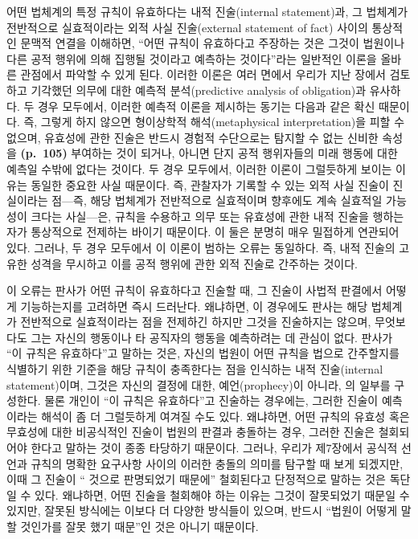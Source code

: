 어떤 법체계의 특정 규칙이 유효하다는 내적 진술(internal statement)과, 그
법체계가 전반적으로 실효적이라는 외적 사실 진술(external statement of
fact) 사이의 통상적인 문맥적 연결을 이해하면, ``어떤 규칙이 유효하다고
주장하는 것은 그것이 법원이나 다른 공적 행위에 의해 집행될 것이라고
예측하는 것이다''라는 일반적인 이론을 올바른 관점에서 파악할 수 있게
된다. 이러한 이론은 여러 면에서 우리가 지난 장에서 검토하고 기각했던
의무에 대한 예측적 분석(predictive analysis of obligation)과 유사하다.
두 경우 모두에서, 이러한 예측적 이론을 제시하는 동기는 다음과 같은 확신
때문이다. 즉, 그렇게 하지 않으면 형이상학적 해석(metaphysical
interpretation)을 피할 수 없으며, 유효성에 관한 진술은 반드시 경험적
수단으로는 탐지할 수 없는 신비한 속성을 \textbf{(p.~105)} 부여하는 것이
되거나, 아니면 단지 공적 행위자들의 미래 행동에 대한 예측일 수밖에
없다는 것이다. 두 경우 모두에서, 이러한 이론이 그럴듯하게 보이는 이유는
동일한 중요한 사실 때문이다. 즉, 관찰자가 기록할 수 있는 외적 사실
진술이 진실이라는 점---즉, 해당 법체계가 전반적으로 실효적이며 향후에도
계속 실효적일 가능성이 크다는 사실---은, 규칙을 수용하고 의무 또는
유효성에 관한 내적 진술을 행하는 자가 통상적으로 전제하는 바이기
때문이다. 이 둘은 분명히 매우 밀접하게 연관되어 있다. 그러나, 두 경우
모두에서 이 이론이 범하는 오류는 동일하다. 즉, 내적 진술의 고유한 성격을
무시하고 이를 공적 행위에 관한 외적 진술로 간주하는 것이다.

이 오류는 판사가 어떤 규칙이 유효하다고 진술할 때, 그 진술이 사법적
판결에서 어떻게 기능하는지를 고려하면 즉시 드러난다. 왜냐하면, 이
경우에도 판사는 해당 법체계가 전반적으로 실효적이라는 점을 전제하긴
하지만 그것을 진술하지는 않으며, 무엇보다도 그는 자신의 행동이나 타
공직자의 행동을 예측하려는 데 관심이 없다. 판사가 ``이 규칙은
유효하다''고 말하는 것은, 자신의 법원이 어떤 규칙을 법으로 간주할지를
식별하기 위한 기준을 해당 규칙이 충족한다는 점을 인식하는 내적
진술(internal statement)이며, 그것은 자신의 결정에 대한,
예언(prophecy)이 아니라, 의 일부를 구성한다. 물론
개인이 ``이 규칙은 유효하다''고 진술하는 경우에는, 그러한 진술이
예측이라는 해석이 좀 더 그럴듯하게 여겨질 수도 있다. 왜냐하면, 어떤
규칙의 유효성 혹은 무효성에 대한 비공식적인 진술이 법원의 판결과
충돌하는 경우, 그러한 진술은 철회되어야 한다고 말하는 것이 종종 타당하기
때문이다. 그러나, 우리가 제7장에서 공식적 선언과 규칙의 명확한 요구사항
사이의 이러한 충돌의 의미를 탐구할 때 보게 되겠지만, 이때 그 진술이
`` 것으로 판명되었기 때문에'' 철회된다고 단정적으로
말하는 것은 독단일 수 있다. 왜냐하면, 어떤 진술을 철회해야 하는 이유는
그것이 잘못되었기 때문일 수 있지만, 잘못된 방식에는 이보다 더 다양한
방식들이 있으며, 반드시 ``법원이 어떻게 말할 것인가를 잘못
했기 때문''인 것은 아니기 때문이다.

